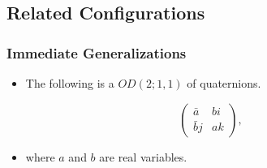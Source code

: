 \documentclass{beamer}
\begin{document}

\subsection{Related Configurations}


\subsubsection{Immediate Generalizations}

\begin{frame}

  \begin{itemize}
  \item The following is a $OD(2;1,1)$ of quaternions.
  \end{itemize}

  \[
    \begin{pmatrix}
      \bar{a} & bi \\
      \bar{b}j & ak
    \end{pmatrix},
  \]

  \begin{itemize}
  \item where $a$ and $b$ are real variables.
  \end{itemize}
  
\end{frame}
\end{document}
